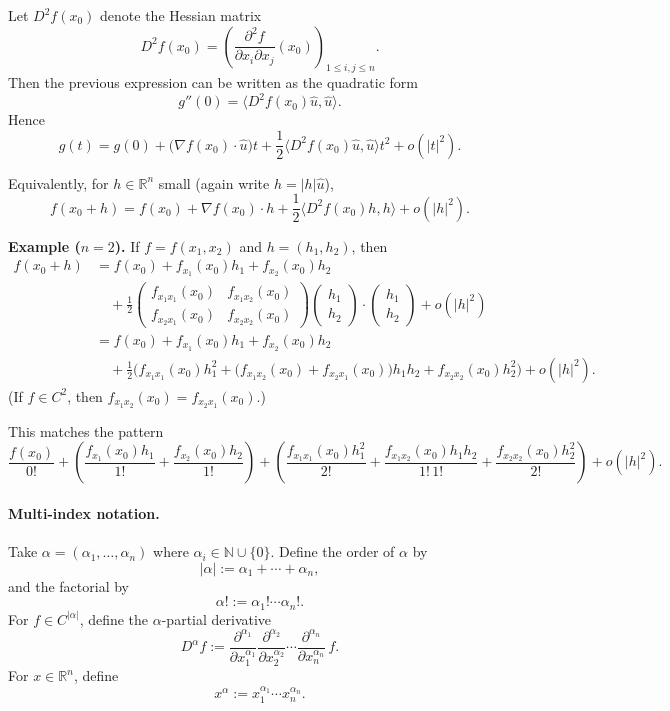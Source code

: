 \documentclass[11pt,a4paper]{article}
\theoremstyle{definition}
\theoremstyle{plain}
\theoremstyle{remark}
\newcommand{\R}{\mathbb{R}}
\newcommand{\N}{\mathbb{N}}
\begin{document}
Let $D^2f(x_0)$ denote the Hessian matrix
\[
D^2f(x_0)=\left(\frac{\partial^2 f}{\partial x_i\partial x_j}(x_0)\right)_{1\le i,j\le n}.
\]
Then the previous expression can be written as the quadratic form
\[
g''(0)=\big\langle D^2f(x_0)\hat u,\hat u\big\rangle.
\]
Hence
\[
g(t)=g(0)+\big(\nabla f(x_0)\cdot \hat u\big)t+\frac{1}{2}\big\langle D^2f(x_0)\hat u,\hat u\big\rangle t^2+o(|t|^2).
\]

Equivalently, for $h\in\R^n$ small (again write $h=|h|\hat u$),
\[
f(x_0+h)=f(x_0)+\nabla f(x_0)\cdot h+\frac{1}{2}\big\langle D^2f(x_0)h,h\big\rangle+o(|h|^2).
\]

\medskip

\textbf{Example ($n=2$).} If $f=f(x_1,x_2)$ and $h=(h_1,h_2)$, then
\begin{align*}
f(x_0+h)
&=f(x_0)+f_{x_1}(x_0)h_1+f_{x_2}(x_0)h_2\\
&\quad+\frac{1}{2}
\begin{pmatrix}
f_{x_1x_1}(x_0) & f_{x_1x_2}(x_0)\\
f_{x_2x_1}(x_0) & f_{x_2x_2}(x_0)
\end{pmatrix}
\begin{pmatrix}
h_1\\ h_2
\end{pmatrix}\cdot
\begin{pmatrix}
h_1\\ h_2
\end{pmatrix}
+o(|h|^2)\\
&=f(x_0)+f_{x_1}(x_0)h_1+f_{x_2}(x_0)h_2\\
&\quad+\frac{1}{2}\Big(f_{x_1x_1}(x_0)h_1^2+\big(f_{x_1x_2}(x_0)+f_{x_2x_1}(x_0)\big)h_1h_2+f_{x_2x_2}(x_0)h_2^2\Big)
+o(|h|^2).
\end{align*}
(If $f\in C^2$, then $f_{x_1x_2}(x_0)=f_{x_2x_1}(x_0)$.)

This matches the pattern
\[
\frac{f(x_0)}{0!}
+\left(\frac{f_{x_1}(x_0)h_1}{1!}+\frac{f_{x_2}(x_0)h_2}{1!}\right)
+\left(\frac{f_{x_1x_1}(x_0)h_1^2}{2!}+\frac{f_{x_1x_2}(x_0)h_1h_2}{1!\,1!}
+\frac{f_{x_2x_2}(x_0)h_2^2}{2!}\right)
+o(|h|^2).
\]

\paragraph{Multi-index notation.}
Take $\alpha=(\alpha_1,\dots,\alpha_n)$ where $\alpha_i\in\N\cup\{0\}$. Define the order of $\alpha$ by
\[
|\alpha|:=\alpha_1+\cdots+\alpha_n,
\]
and the factorial by
\[
\alpha!:=\alpha_1!\cdots \alpha_n!.
\]
For $f\in C^{|\alpha|}$, define the $\alpha$-partial derivative
\[
D^\alpha f
:=\frac{\partial^{\alpha_1}}{\partial x_1^{\alpha_1}}
\frac{\partial^{\alpha_2}}{\partial x_2^{\alpha_2}}
\cdots
\frac{\partial^{\alpha_n}}{\partial x_n^{\alpha_n}}\,f.
\]
For $x\in\R^n$, define
\[
x^\alpha:=x_1^{\alpha_1}\cdots x_n^{\alpha_n}.
\]
\end{document}
